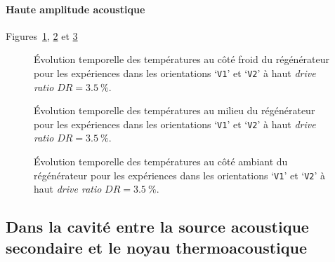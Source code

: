 \paragraph{Haute amplitude acoustique} Figures~\ref{fig:Acou_CHXin_V1V2_High}, \ref{fig:Acou_Regmid_V1V2_High} et \ref{fig:Acou_AHXin_V1V2_High}
\begin{figure}[!ht] %
    \centering
    
    \caption{\'Evolution temporelle des températures au côté froid du régénérateur pour les expériences dans les orientations `\texttt{V1}' et `\texttt{V2}' à haut \textit{drive ratio} $DR=\qty{3.5}{\percent}$.}
    \label{fig:Acou_CHXin_V1V2_High}
\end{figure}

\begin{figure}[!ht] %
    \centering
    
    \caption{\'Evolution temporelle des températures au milieu du régénérateur pour les expériences dans les orientations `\texttt{V1}' et `\texttt{V2}' à haut \textit{drive ratio} $DR=\qty{3.5}{\percent}$.}
    \label{fig:Acou_Regmid_V1V2_High}
\end{figure}

\begin{figure}[!ht] %
    \centering
    
    \caption{\'Evolution temporelle des températures au côté ambiant du régénérateur pour les expériences dans les orientations `\texttt{V1}' et `\texttt{V2}' à haut \textit{drive ratio} $DR=\qty{3.5}{\percent}$.}
    \label{fig:Acou_AHXin_V1V2_High}
\end{figure}





\subsection{Dans la cavité entre la source acoustique secondaire et le noyau thermoacoustique}

%    
%
%    

